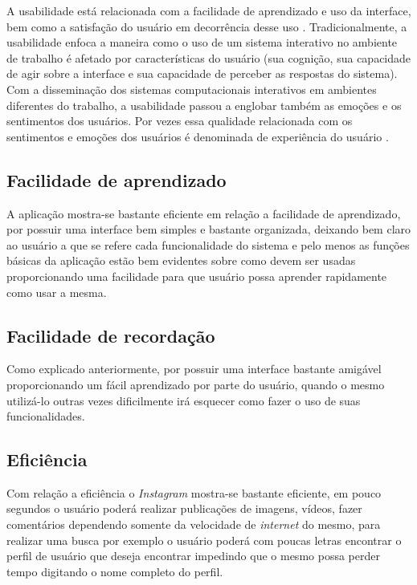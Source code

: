 \documentclass[
	12pt,				%
	openright,			%
	oneside,			%
	a4paper,			%
	english,			%
	french,				%
	spanish,			%
	brazil,				%
	]{abntex2}
\begin{document}
A usabilidade está relacionada com a facilidade de aprendizado e uso da interface, bem como a satisfação do usuário em decorrência desse uso \cite{nielsen}. Tradicionalmente, a usabilidade enfoca a maneira como o uso de um sistema interativo no ambiente de trabalho é afetado por características do usuário (sua cognição, sua capacidade de agir sobre a interface e sua capacidade de perceber as respostas do sistema). Com a disseminação dos sistemas computacionais interativos em ambientes diferentes do trabalho, a usabilidade passou a englobar também as emoções e os sentimentos dos usuários. Por vezes essa qualidade relacionada com os sentimentos e emoções dos usuários é denominada de experiência do usuário \cite{sharp}.

\subsection{Facilidade de aprendizado}

A aplicação mostra-se bastante eficiente em relação a facilidade de aprendizado, por possuir uma interface bem simples e bastante organizada, deixando bem claro ao usuário a que se refere cada funcionalidade do sistema e pelo menos as funções básicas da aplicação estão bem evidentes sobre como devem ser usadas proporcionando uma facilidade para que usuário possa aprender rapidamente como usar a mesma.

\subsection{Facilidade de recordação}

Como explicado anteriormente, por possuir uma interface bastante amigável proporcionando um fácil aprendizado por parte do usuário, quando o mesmo utilizá-lo outras vezes dificilmente irá esquecer como fazer o uso de suas funcionalidades.

\subsection{Eficiência}

Com relação a eficiência o \textit{Instagram} mostra-se bastante eficiente, em pouco segundos o usuário poderá realizar publicações de imagens, vídeos, fazer comentários dependendo somente da velocidade de \textit{internet} do mesmo, para realizar uma busca por exemplo o usuário poderá com poucas letras encontrar o perfil de usuário que deseja encontrar impedindo que o mesmo possa perder tempo digitando o nome completo do perfil.
\end{document}
